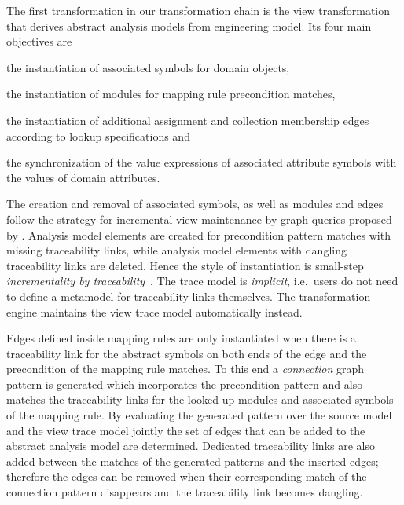 The first transformation in our transformation chain is the view transformation that derives abstract  analysis models from engineering model. Its four main objectives are
\begin{itemize*}
\item the instantiation of associated symbols for domain objects,
\item the instantiation of  modules for mapping rule precondition matches,
\item the instantiation of additional assignment and collection membership edges according to lookup specifications and
\item the synchronization of the value expressions of associated attribute symbols with the values of domain attributes.
\end{itemize*}

The creation and removal of associated symbols, as well as  modules and edges follow the strategy for incremental view maintenance by graph queries proposed by \citet{Debreceni14viewmodel}. Analysis model elements are created for precondition pattern matches with missing traceability links, while analysis model elements with dangling traceability links are deleted. Hence the style of instantiation is small-step \emph{incrementality by traceability}~\citep{Varro15styles}. The trace model is \emph{implicit}, i.e.~users do not need to define a metamodel for traceability links themselves. The transformation engine maintains the view trace model automatically instead.

Edges defined inside mapping rules are only instantiated when there is a traceability link for the abstract  symbols on both ends of the edge and the precondition of the mapping rule matches. To this end a \emph{connection} graph pattern is generated which incorporates the precondition pattern and  also matches the traceability links for the looked up  modules and associated symbols of the mapping rule. By evaluating the generated pattern over the source model and the view trace model jointly the set of edges that can be added to the abstract analysis model are determined. Dedicated traceability links are also added between the matches of the generated patterns and the inserted edges; therefore the edges can be removed when their corresponding match of the connection pattern disappears and the traceability link becomes dangling.

